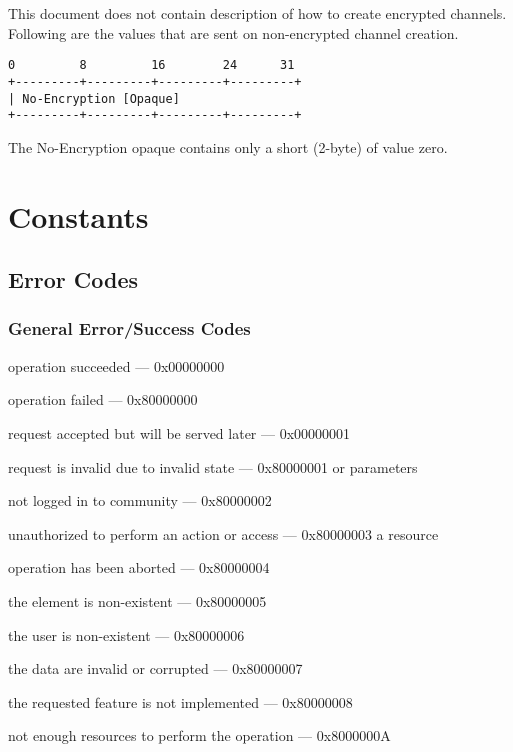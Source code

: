 \documentclass[titlepage,oneside]{book}
\begin{document}
\par{} This document does not contain description of how to create
encrypted channels. Following are the values that are sent on
non-encrypted channel creation.

\begin{verbatim}
0         8         16        24      31
+---------+---------+---------+---------+
| No-Encryption [Opaque]
+---------+---------+---------+---------+
\end{verbatim}

\par{} The No-Encryption opaque contains only a short (2-byte) of
value zero.

\section{Constants}

\subsection{Error Codes}

\subsubsection{General Error/Success Codes}

operation succeeded                               --- 0x00000000

operation failed                                  --- 0x80000000

request accepted but will be served later         --- 0x00000001

request is invalid due to invalid state           --- 0x80000001
or parameters

not logged in to community                        --- 0x80000002

unauthorized to perform an action or access       --- 0x80000003
a resource

operation has been aborted                        --- 0x80000004

the element is non-existent                       --- 0x80000005

the user is non-existent                          --- 0x80000006

the data are invalid or corrupted                 --- 0x80000007

the requested feature is not implemented          --- 0x80000008

not enough resources to perform the operation     --- 0x8000000A
\end{document}
